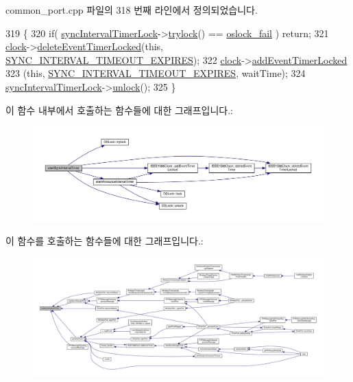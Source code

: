 common\+\_\+port.\+cpp 파일의 318 번째 라인에서 정의되었습니다.


\begin{DoxyCode}
319 \{
320     \textcolor{keywordflow}{if}( \hyperlink{class_common_port_a2457c760017e253f1202eb8cfef7c00b}{syncIntervalTimerLock}->\hyperlink{class_o_s_lock_ae98ef550f527786080703feace242487}{trylock}() == 
      \hyperlink{avbts__oslock_8hpp_a6ade377184a937ebffbe2a94b7369a64a7d89b4d4b626b10cd99e6179eb7bedc3}{oslock\_fail} ) \textcolor{keywordflow}{return};
321     \hyperlink{class_common_port_aa2bc8731fa5aeb5b033feebc2b67258c}{clock}->\hyperlink{class_i_e_e_e1588_clock_ab3079a65b0509eeb40c2828fa6a7834a}{deleteEventTimerLocked}(\textcolor{keyword}{this}, 
      \hyperlink{ieee1588_8hpp_a5667b805d857c6d28f83f6038a0272d3a3dba953a3ff5fdac319eca872a7fbc87}{SYNC\_INTERVAL\_TIMEOUT\_EXPIRES});
322     \hyperlink{class_common_port_aa2bc8731fa5aeb5b033feebc2b67258c}{clock}->\hyperlink{class_i_e_e_e1588_clock_a4747f09108bd78ecd68d58dad4358d77}{addEventTimerLocked}
323         (\textcolor{keyword}{this}, \hyperlink{ieee1588_8hpp_a5667b805d857c6d28f83f6038a0272d3a3dba953a3ff5fdac319eca872a7fbc87}{SYNC\_INTERVAL\_TIMEOUT\_EXPIRES}, waitTime);
324     \hyperlink{class_common_port_a2457c760017e253f1202eb8cfef7c00b}{syncIntervalTimerLock}->\hyperlink{class_o_s_lock_a5b965df44250112cac3cf967dc998bec}{unlock}();
325 \}
\end{DoxyCode}


이 함수 내부에서 호출하는 함수들에 대한 그래프입니다.\+:
\nopagebreak
\begin{figure}[H]
\begin{center}
\leavevmode
\includegraphics[width=350pt]{class_common_port_a2033d126c19548eb5ada2d623667e1f2_cgraph}
\end{center}
\end{figure}




이 함수를 호출하는 함수들에 대한 그래프입니다.\+:
\nopagebreak
\begin{figure}[H]
\begin{center}
\leavevmode
\includegraphics[width=350pt]{class_common_port_a2033d126c19548eb5ada2d623667e1f2_icgraph}
\end{center}
\end{figure}


